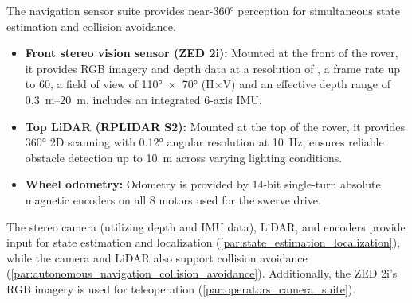 %

The navigation sensor suite provides near-\ang{360} perception for simultaneous state estimation and collision avoidance.

\begin{itemize}
    \item \textbf{Front stereo vision sensor (ZED 2i):} Mounted at the front of the rover, it provides RGB imagery and depth data at a resolution of , a frame rate up to \qty{60}{\fps}, a field of view of \ang{110}~$\times$~\ang{70} (H$\times$V) and an effective depth range of \qtyrange{0.3}{20}{\metre}, includes an integrated 6-axis IMU.

    \item \textbf{Top LiDAR (RPLIDAR S2):} Mounted at the top of the rover, it provides \ang{360} 2D scanning with \ang{0.12} angular resolution at \qty{10}{\hertz}, ensures reliable obstacle detection up to \qty{10}{\metre} across varying lighting conditions.

    \item \textbf{Wheel odometry:} Odometry is provided by 14-bit single-turn absolute magnetic encoders on all 8 motors used for the swerve drive.
\end{itemize}

The stereo camera (utilizing depth and IMU data), LiDAR, and encoders provide input for state estimation and localization (\autoref{par:state_estimation_localization}), while the camera and LiDAR also support collision avoidance (\autoref{par:autonomous_navigation_collision_avoidance}). Additionally, the ZED 2i's RGB imagery is used for teleoperation (\autoref{par:operators_camera_suite}).
